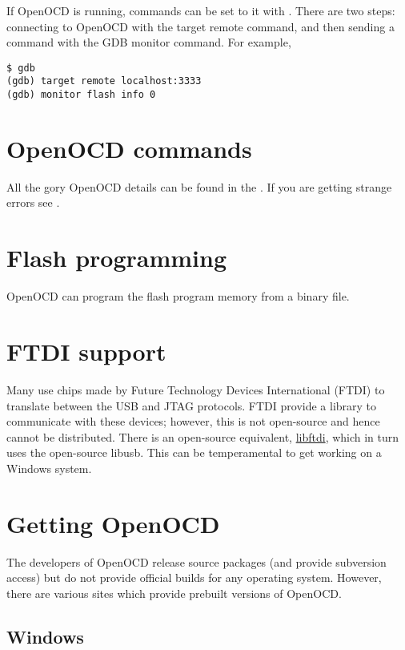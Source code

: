 If OpenOCD is running, commands can be set to it with
. There are two steps: connecting to OpenOCD with
the target remote command, and then sending a command with the GDB
monitor command. For example,

\begin{verbatim}
$ gdb
(gdb) target remote localhost:3333
(gdb) monitor flash info 0
\end{verbatim}

\section{OpenOCD commands}
\label{openocd-commands}

All the gory OpenOCD details can be found in the
. If you are getting strange
errors see .

\section{Flash programming}
\label{flash-programming}

OpenOCD can program the flash program memory from a binary file.

\section{FTDI support}
\label{ftdi-support}

Many  use chips made by Future
Technology Devices International (FTDI) to translate between the USB and
JTAG protocols. FTDI provide a library to communicate with these
devices; however, this is not open-source and hence cannot be
distributed. There is an open-source equivalent,
\href{http://freshmeat.net/projects/libftdi/}{libftdi}, which in turn
uses the open-source libusb. This can be temperamental to get working on
a Windows system.

\section{Getting OpenOCD}
\label{getting-openocd}

The developers of OpenOCD release source packages (and provide
subversion access) but do not provide official builds for any
operating system. However, there are various sites which provide
prebuilt versions of OpenOCD.

\subsection{Windows}
\label{windows}


